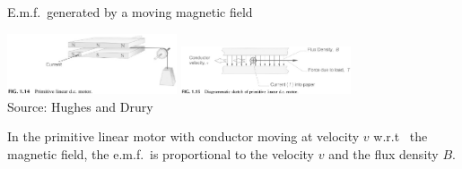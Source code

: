 \documentclass[dvisvgm,hypertex,aspectratio=169]{beamer}
\begin{document}

\begin{frame}{E.m.f.~generated by a moving magnetic field}
\begin{center}
\includegraphics[width=5cm]{HD-fig1_14.png}
\includegraphics[width=5cm]{HD-fig1_15.png}\\
{\footnotesize Source: Hughes and Drury}
\end{center}

In the primitive linear motor with conductor moving at velocity $v$ w.r.t~ the magnetic field, the e.m.f.~is proportional to the velocity $v$ and the flux density $B$.

\end{frame}
\end{document}
